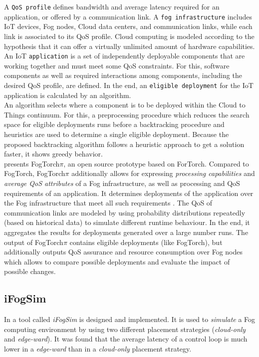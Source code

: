 A \texttt{QoS profile} defines bandwidth and average latency required for an application, or offered by a communication link. A \texttt{fog infrastructure} includes IoT devices, Fog nodes, Cloud data centers, and communication links, while each link is associated to its QoS profile. Cloud computing is modeled according to the hypothesis that it can offer a virtually unlimited amount of hardware capabilities. An IoT \texttt{application} is a set of independently deployable components that are working together and must meet some QoS constraints. For this, software components as well as required interactions among components, including the desired QoS profile, are defined. In the end, an \texttt{eligible deployment} for the IoT application is calculated by an algorithm.\\

An algorithm selects where a component is to be deployed within the Cloud to Things continuum. For this, a preprocessing procedure which reduces the search space for eligible deployments runs before a backtracking procedure and heuristics are used to determine a single eligible deployment. Because the proposed backtracking algorithm follows a heuristic approach to get a solution faster, it shows greedy behavior.\\

\cite{fogtorchpi} presents FogTorch$\pi$, an open source prototype based on ForTorch\cite{fogtorch}.
Compared to FogTorch, FogTorch$\pi$ additionally allows for expressing \textit{processing capabilities} and \textit{average QoS attributes} of a Fog infrastructure, as well as processing and QoS requirements of an application.
It determines deployments of the application over the Fog infrastructure that meet all such requirements \cite{fogtorchpi}.
The QoS of communication links are modeled by using probability distributions repeatedly (based on historical data) to simulate different runtime behaviour.
In the end, it aggregates the results for deployments generated over a large number runs.
The output of FogTorch$\pi$ contains eligible deployments (like FogTorch), but additionally outputs QoS assurance and resource consumption over Fog nodes which allows to compare possible deployments and evaluate the impact of possible changes.

\subsection{iFogSim}

In \cite{ifogsim} a tool called \textit{iFogSim} is designed and implemented. It is used to \textit{simulate} a Fog computing environment by using two different placement strategies (\textit{cloud-only} and \textit{edge-ward}). It was found that the average latency of a control loop is much lower in a \textit{edge-ward} than in a \textit{cloud-only} placement strategy.\\

